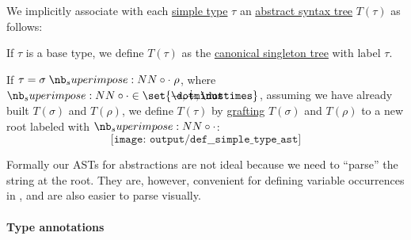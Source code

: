 \begin{definition}\label{def:simple_type_ast}\mimprovised
  We implicitly associate with each \hyperref[def:simple_type]{simple type} \( \tau \) an \hyperref[con:abstract_syntax_tree]{abstract syntax tree} \( T(\tau) \) as follows:
  \begin{thmenum}
     If \( \tau \) is a base type, we define \( T(\tau) \) as the \hyperref[def:canonical_singleton_tree]{canonical singleton tree} with label \( \tau \).

     If \( \tau = \sigma \syncirc \rho \), where \( {\syncirc} \in \set{ \synimplies, \synplus, \syntimes } \), assuming we have already built \( T(\sigma) \) and \( T(\rho) \), we define \( T(\tau) \) by \hyperref[def:ordered_tree_grafting_product]{grafting} \( T(\sigma) \) and \( T(\rho) \) to a new root labeled with \( \syncirc \):
    \begin{equation*}
      \texttt{[image: output/def\_\_simple\_type\_ast]}
    \end{equation*}
  \end{thmenum}
\end{definition}
\begin{comments}
  \item Formally our ASTs for abstractions are not ideal because we need to \enquote{parse} the string at the root. They are, however, convenient for defining variable occurrences in , and are also easier to parse visually.
\end{comments}

\paragraph{Type annotations}

